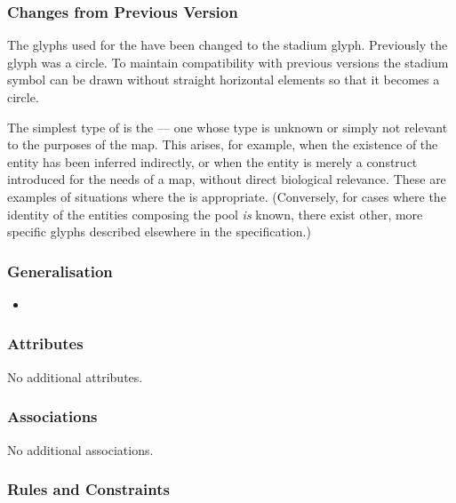 \subsubsection{Changes from Previous Version}

The glyphs used for the  have been changed
to the stadium glyph. Previously the glyph was a circle. To maintain
compatibility with previous versions the stadium symbol can be drawn
without straight horizontal elements so that it becomes a circle.

\label{sec:techref:unspecifiedEntity}

The simplest type of  is the
 --- one whose type is unknown or simply
not relevant to the purposes of the map.  This arises, for example,
when the existence of the entity has been inferred indirectly, or when
the entity is merely a construct introduced for the needs of a map,
without direct biological relevance.  These are examples of situations
where the  is appropriate.  (Conversely,
for cases where the identity of the entities composing the pool
\emph{is} known, there exist other, more specific glyphs described
elsewhere in the specification.)

\subsubsection{Generalisation}

\begin{itemize}
\item {}
\end{itemize}

\subsubsection{Attributes}

No additional attributes.

\subsubsection{Associations}

No additional associations.

\subsubsection{Rules and Constraints}

